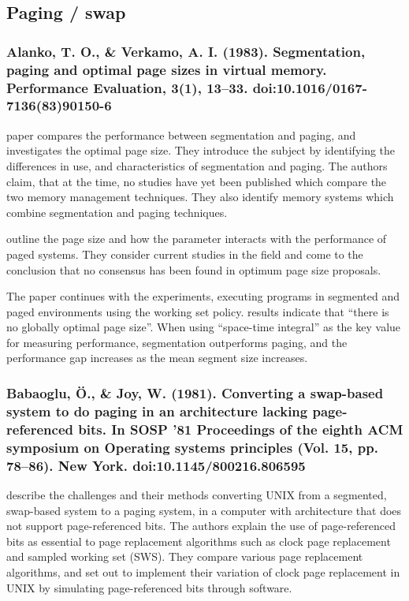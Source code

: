 \newpage

\subsection{Paging / swap}

\subsubsection*{Alanko, T. O., \& Verkamo, A. I. (1983). Segmentation, paging and optimal page sizes in virtual memory. Performance Evaluation, 3(1), 13–33. doi:10.1016/0167-7136(83)90150-6}

 paper compares the performance between segmentation and paging, and investigates the optimal page size. They introduce the subject by identifying the differences in use, and characteristics of segmentation and paging. The authors claim, that at the time, no studies have yet been published which compare the two memory management techniques. They also identify memory systems which combine segmentation and paging techniques.

\citet{Alanko1983} outline the page size and how the parameter interacts with the performance of paged systems. They consider current studies in the field and come to the conclusion that no consensus has been found in optimum page size proposals.

The paper continues with the experiments, executing programs in segmented and paged environments using the working set policy.  results indicate that ``there is no globally optimal page size''. When using ``space-time integral'' as the key value for measuring performance, segmentation outperforms paging, and the performance gap increases as the mean segment size increases. 

\subsubsection*{Babaoglu, Ö., \& Joy, W. (1981). Converting a swap-based system to do paging in an architecture lacking page-referenced bits. In SOSP ’81 Proceedings of the eighth ACM symposium on Operating systems principles (Vol. 15, pp. 78–86). New York. doi:10.1145/800216.806595}

\citet{Babaoglu1981} describe the challenges and their methods converting UNIX from a segmented, swap-based system to a paging system, in a computer with architecture that does not support page-referenced bits. The authors explain the use of page-referenced bits as essential to page replacement algorithms such as clock page replacement and sampled working set (SWS). They compare various page replacement algorithms, and set out to implement their variation of clock page replacement in UNIX by simulating page-referenced bits through software.

